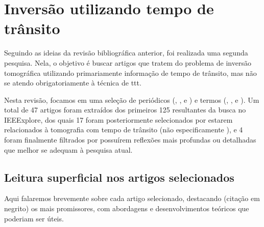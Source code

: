 \section{Inversão utilizando tempo de trânsito}
\label{sec_rt}
Seguindo as ideias da revisão bibliográfica anterior, foi realizada uma segunda pesquisa. Nela, o objetivo é buscar artigos que tratem do problema de inversão tomográfica utilizando primariamente informação de tempo de trânsito, mas não se atendo obrigatoriamente à técnica de \gls{ttt}.

Nesta revisão, focamos em uma seleção de periódicos (, , e ) e termos (, , e ). Um total de 47 artigos foram extraídos dos primeiros 125 resultantes da busca no IEEExplore, dos quais 17 foram posteriormente selecionados por estarem relacionados à tomografia com tempo de trânsito (não especificamente ), e 4 foram finalmente filtrados por possuírem reflexões mais profundas ou detalhadas que melhor se adequam à pesquisa atual.

\subsection{Leitura superficial nos artigos selecionados}

Aqui falaremos brevemente sobre cada artigo selecionado, destacando (citação em negrito) os mais promissores, com abordagens e desenvolvimentos teóricos que poderiam ser úteis.

